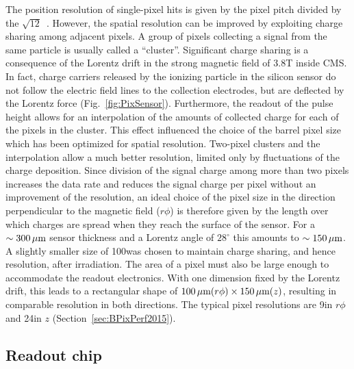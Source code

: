The position resolution of single-pixel hits is given by the pixel pitch divided by the $\sqrt{12}$~\cite{PixelDetectorsBook2006}.
However, the spatial resolution can be improved by exploiting charge sharing among adjacent pixels. A group of pixels collecting a signal from the same particle is usually called a ``cluster''.
Significant charge sharing is a consequence of the Lorentz drift in the strong magnetic field of 3.8\unit{T} inside CMS.
In fact, charge carriers released by the ionizing particle in the silicon sensor do not follow the electric field lines to the collection electrodes,
but are deflected by the Lorentz force (Fig.~\ref{fig:PixSensor}).
Furthermore, the readout of the pulse height allows for an interpolation of the amounts of collected charge for each of the pixels in the cluster.
This effect influenced the choice of the barrel pixel size which has been optimized for spatial resolution.
Two-pixel clusters and the interpolation allow a much better resolution, limited only by fluctuations of the charge deposition.
Since division of the signal charge among more than two pixels increases the data rate and reduces the signal charge per pixel without an improvement of the resolution, an ideal choice of the pixel size in the direction perpendicular to the magnetic field ($r\phi$) is therefore given by the length over which charges are spread when they reach the surface of the sensor.
For a $\sim300\,\mu\text{m}$ sensor thickness and a Lorentz angle of $28^\circ$ this amounts to $\sim150\,\mu\text{m}$.
A slightly smaller size of 100\mum was chosen to maintain charge sharing, and hence resolution, after irradiation.
The area of a pixel must also be large enough to accommodate the readout electronics.
With one dimension fixed by the Lorentz drift, this leads to a rectangular shape of $100\,\mu\text{m}(r\phi)\times150\,\mu\text{m}(z)$, resulting in comparable resolution in both directions.
The typical pixel resolutions are 9\mum in $r\phi$ and 24\mum in $z$ (Section~\ref{sec:BPixPerf2015}).

\subsection{Readout chip}\label{subsec:BPix_ROC}


